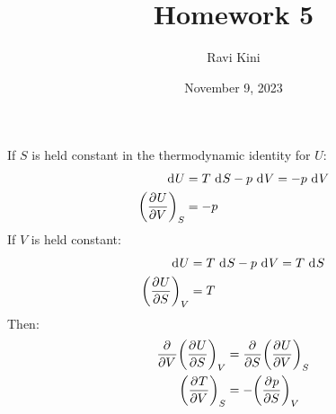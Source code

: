 \documentclass{article}
\title{Homework 5}
\author{Ravi Kini}
\date{November 9, 2023}
\begin{document}
\maketitle

If $S$ is held constant in the thermodynamic identity for $U$:
\begin{equation}
    \begin{split}
        \diff{U} & = T \, \diff{S} - p \, \diff{V} = -p \, \diff{V} \\
        {\left(\pderiv{U}{V}\right)}_S & = -p
    \end{split}
\end{equation}
If $V$ is held constant:
\begin{equation}
    \begin{split}
        \diff{U} & = T \, \diff{S} - p \, \diff{V} = T \, \diff{S} \\
        {\left(\pderiv{U}{S}\right)}_V & = T
    \end{split}
\end{equation}
Then:
\begin{equation}
    \begin{split}
        \frac{\partial^{}} {\partial V^{}}{\left(\frac{\partial^{}U} {\partial S^{}}\right)}_V & = \frac{\partial^{}} {\partial S^{}}{\left(\frac{\partial^{}U} {\partial V^{}}\right)}_S \\
        {\left(\frac{\partial^{}T} {\partial V^{}}\right)}_S & = -{\left(\frac{\partial^{}p} {\partial S^{}}\right)}_V
    \end{split}
\end{equation}

\clearpage

\end{document}
